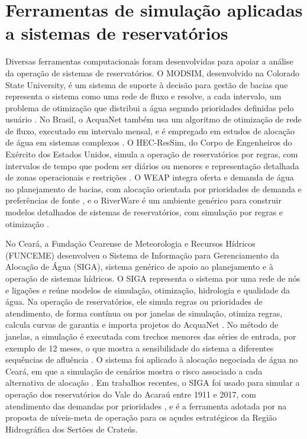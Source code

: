 \section{Ferramentas de simulação aplicadas a sistemas de reservatórios}
\label{sec:trabalhos-relacionados}

Diversas ferramentas computacionais foram desenvolvidas para apoiar a análise da operação de sistemas de reservatórios. O MODSIM, desenvolvido na Colorado State University, é um sistema de suporte à decisão para gestão de bacias que representa o sistema como uma rede de fluxo e resolve, a cada intervalo, um problema de otimização que distribui a água segundo prioridades definidas pelo usuário \cite{labadie2004,tamu2007modsim}. No Brasil, o AcquaNet também usa um algoritmo de otimização de rede de fluxo, executado em intervalo mensal, e é empregado em estudos de alocação de água em sistemas complexos \cite{schardong2009acquanet}. O HEC-ResSim, do Corpo de Engenheiros do Exército dos Estados Unidos, simula a operação de reservatórios por regras, com intervalos de tempo que podem ser diários ou menores e representação detalhada de zonas operacionais e restrições \cite{klipsch2007ressim}. O WEAP integra oferta e demanda de água no planejamento de bacias, com alocação orientada por prioridades de demanda e preferências de fonte \cite{yates2005weap}, e o RiverWare é um ambiente genérico para construir modelos detalhados de sistemas de reservatórios, com simulação por regras e otimização \cite{zagona2001riverware}.

No Ceará, a Fundação Cearense de Meteorologia e Recursos Hídricos (FUNCEME) desenvolveu o Sistema de Informação para Gerenciamento da Alocação de Água (SIGA), sistema genérico de apoio ao planejamento e à operação de sistemas hídricos. O SIGA representa o sistema por uma rede de nós e ligações e reúne modelos de simulação, otimização, hidrologia e qualidade da água. Na operação de reservatórios, ele simula regras ou prioridades de atendimento, de forma contínua ou por janelas de simulação, otimiza regras, calcula curvas de garantia e importa projetos do AcquaNet \cite{funcemeSiga}. No método de janelas, a simulação é executada com trechos menores das séries de entrada, por exemplo de 12 meses, o que mostra a sensibilidade do sistema a diferentes sequências de afluência \cite{funcemeSiga}. O sistema foi aplicado à alocação negociada de água no Ceará, em que a simulação de cenários mostra o risco associado a cada alternativa de alocação \cite{barros2013siga}. Em trabalhos recentes, o SIGA foi usado para simular a operação dos reservatórios do Vale do Acaraú entre 1911 e 2017, com atendimento das demandas por prioridades \cite{araujo2025acarau}, e é a ferramenta adotada por  na proposta de níveis-meta de operação para os açudes estratégicos da Região Hidrográfica dos Sertões de Crateús.

